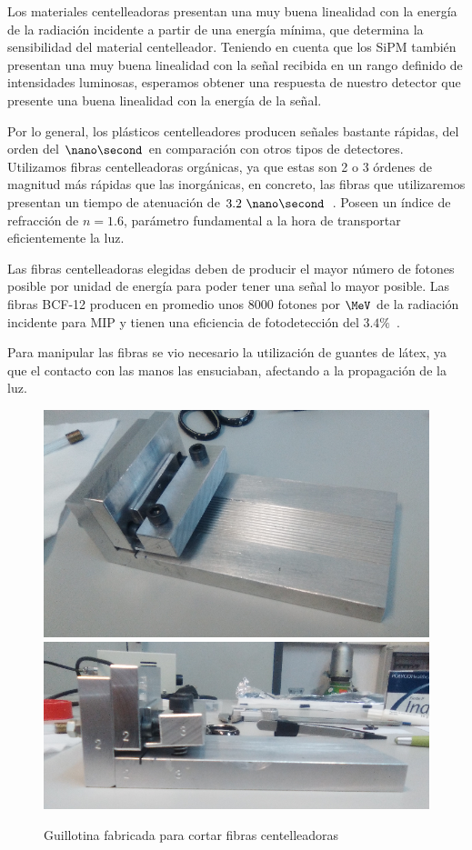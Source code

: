 Los materiales centelleadoras presentan una muy buena linealidad con la energía de la radiación incidente a partir de una energía mínima, que determina la sensibilidad del material centelleador. Teniendo en cuenta que los SiPM también presentan una muy buena linealidad con la señal recibida en un rango definido de intensidades luminosas, esperamos obtener una respuesta de nuestro detector que presente una buena linealidad con la energía de la señal.

Por lo general, los plásticos centelleadores producen señales bastante rápidas, del orden del $\nano\second$ en comparación con otros tipos de detectores. Utilizamos fibras centelleadoras orgánicas, ya que estas son 2 o 3 órdenes de magnitud más rápidas que las inorgánicas,  en concreto, las fibras que utilizaremos presentan un tiempo de atenuación de $3.2~\nano\second$~\cite{datasheet}. Poseen un índice de refracción de $n=1.6$, parámetro fundamental a la hora de transportar eficientemente la luz.

Las fibras centelleadoras elegidas deben de producir el mayor número de fotones  posible por unidad de energía para poder tener una señal lo mayor posible. Las fibras BCF-12 producen en promedio unos  $8000$ fotones por $\MeV$ de la radiación incidente para MIP y tienen una eficiencia de fotodetección  del $3.4\%$~\cite{datasheet}.

Para manipular las fibras se vio necesario la utilización de guantes de látex, ya que el contacto con las manos  las ensuciaban, afectando a  la propagación de la luz.

\begin{figure}[htb]
\centering
{
\includegraphics[scale=0.25]{Guillotina1.png} 
}
{
\includegraphics[scale=0.33]{Guillotina2.png} 
}
\caption{Guillotina fabricada para cortar fibras centelleadoras\label{Guillotina}}
\end{figure} 


